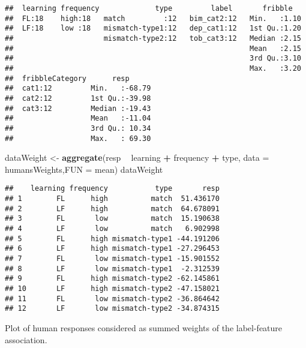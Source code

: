 \documentclass[
]{article}
\newenvironment{Shaded}{\begin{snugshade}}{\end{snugshade}}
\newcommand{\DataTypeTok}[1]{\textcolor[rgb]{0.13,0.29,0.53}{#1}}
\newcommand{\KeywordTok}[1]{\textcolor[rgb]{0.13,0.29,0.53}{\textbf{#1}}}
\newcommand{\NormalTok}[1]{#1}
\newcommand{\OperatorTok}[1]{\textcolor[rgb]{0.81,0.36,0.00}{\textbf{#1}}}
\newcommand{\StringTok}[1]{\textcolor[rgb]{0.31,0.60,0.02}{#1}}
\begin{document}
\begin{verbatim}
##  learning frequency             type         label       fribble    
##  FL:18    high:18   match         :12   bim_cat2:12   Min.   :1.10  
##  LF:18    low :18   mismatch-type1:12   dep_cat1:12   1st Qu.:1.20  
##                     mismatch-type2:12   tob_cat3:12   Median :2.15  
##                                                       Mean   :2.15  
##                                                       3rd Qu.:3.10  
##                                                       Max.   :3.20  
##  fribbleCategory      resp       
##  cat1:12         Min.   :-68.79  
##  cat2:12         1st Qu.:-39.98  
##  cat3:12         Median :-19.43  
##                  Mean   :-11.04  
##                  3rd Qu.: 10.34  
##                  Max.   : 69.30
\end{verbatim}

\begin{Shaded}
\begin{Highlighting}[]
\NormalTok{dataWeight <-}\StringTok{ }\KeywordTok{aggregate}\NormalTok{(resp }\OperatorTok{~}\StringTok{ }\NormalTok{learning }\OperatorTok{+}\StringTok{ }\NormalTok{frequency }\OperatorTok{+}\StringTok{ }\NormalTok{type, }\DataTypeTok{data =}\NormalTok{ humansWeights,}\DataTypeTok{FUN =}\NormalTok{ mean)}
\NormalTok{dataWeight}
\end{Highlighting}
\end{Shaded}

\begin{verbatim}
##    learning frequency           type       resp
## 1        FL      high          match  51.436170
## 2        LF      high          match  64.678091
## 3        FL       low          match  15.190638
## 4        LF       low          match   6.902998
## 5        FL      high mismatch-type1 -44.191206
## 6        LF      high mismatch-type1 -27.296453
## 7        FL       low mismatch-type1 -15.901552
## 8        LF       low mismatch-type1  -2.312539
## 9        FL      high mismatch-type2 -62.145861
## 10       LF      high mismatch-type2 -47.158021
## 11       FL       low mismatch-type2 -36.864642
## 12       LF       low mismatch-type2 -34.874315
\end{verbatim}

Plot of human responses considered as summed weights of the
label-feature association.
\end{document}
